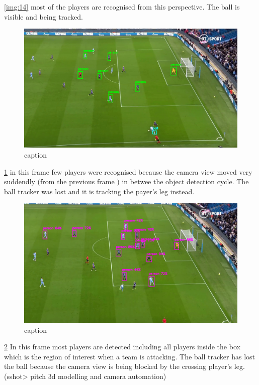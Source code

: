 \documentclass[
11pt,
twoside
]{report}
\begin{document}
\ref{img:14} most of
the players are recognised from this perspective. The ball is visible and being tracked.
\begin{figure}[H]
    \includegraphics[keepaspectratio, width=\columnwidth]{Screenshot_2022-03-03_23-12-29.png}
    \caption{caption}
    \label{img:15}
\end{figure}
\ref{img:15} in this
frame few players were recognised because the camera view moved very suddendly (from the previous frame ) in betwee the object detection cycle. The ball tracker was lost and it is tracking the payer's leg instead.
\begin{figure}[H]
    \includegraphics[keepaspectratio, width=\columnwidth]{Screenshot_2022-03-03_23-13-18.png}
    \caption{caption}
    \label{img:16}
\end{figure}
\ref{img:16} In this
frame most players are detected including all players inside the box which is the region of interest when a team is attacking. The ball tracker has lost the ball because the camera view is being blocked by the crossing player's leg. (sshot\textgreater{} pitch 3d modelling and camera automation)
\end{document}
